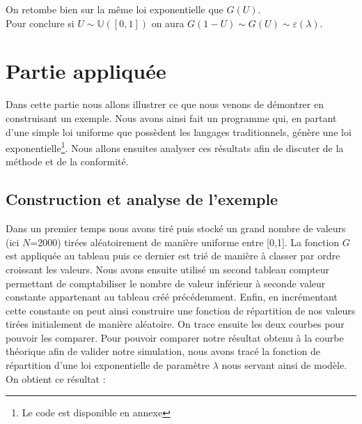 \documentclass[12,french]{report}
\begin{document}
On retombe bien sur la même loi exponentielle que $G(U)$. \\

Pour conclure si $U\sim\mathbb{U}([0,1])$ on aura $G(1-U) \sim G(U)\sim \varepsilon(\lambda)$.

\chapter{Partie appliquée}

Dans cette partie nous allons illustrer ce que nous venons de démontrer en construisant un exemple. Nous avons ainsi fait un programme qui, en partant d'une simple loi uniforme que possèdent les langages traditionnels, génère une loi exponentielle\footnote{Le code est disponible en annexe}. Nous allons ensuites analyser ces résultats afin de discuter de la méthode et de la conformité.\\

\section{Construction et analyse de l'exemple}

Dans un premier temps nous avons tiré puis stocké un grand nombre de valeurs (ici $N$=2000) tirées aléatoirement de manière uniforme entre [0,1]. La fonction $G$ est appliquée au tableau puis ce dernier est trié de manière à classer par ordre croissant les valeurs. Nous avons ensuite utilisé un second tableau compteur permettant de comptabiliser  le nombre de valeur inférieur à seconde valeur constante appartenant au tableau créé précédemment. Enfin, en incrémentant cette constante on peut ainsi construire une fonction de répartition de nos valeurs tirées initialement de manière aléatoire. On trace ensuite les deux courbes pour pouvoir les comparer. Pour pouvoir comparer notre résultat obtenu à la courbe théorique afin de valider notre simulation, nous avons tracé la fonction de répartition d'une loi exponentielle de paramètre $\lambda$ nous servant ainsi de modèle.\\

On obtient ce résultat :
\end{document}

